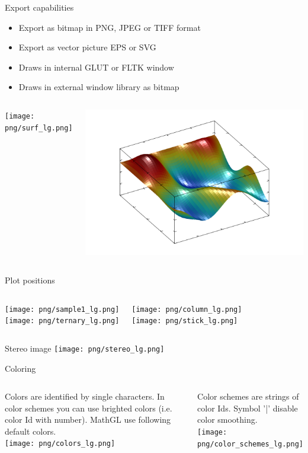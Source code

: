 \documentclass[color=usenames]{beamer}
\begin{document}
\begin{frame}{Export capabilities}
\begin{itemize}
\item Export as bitmap in PNG, JPEG or TIFF format
\item Export as vector picture EPS or SVG
\item Draws in internal GLUT or FLTK window
\item Draws in external window library as bitmap
\end{itemize}
\begin{columns}
\texttt{[image: png/surf\_lg.png]}

\includegraphics[width = \textwidth]{png/surf_eps.png}
\end{columns}
\end{frame}


\begin{frame}{Plot positions}
\begin{columns}
\texttt{[image: png/sample1\_lg.png]}\\
\texttt{[image: png/ternary\_lg.png]}

\texttt{[image: png/column\_lg.png]}\\
\texttt{[image: png/stick\_lg.png]}

\end{columns}
\end{frame}

\begin{frame}{Stereo image}
\texttt{[image: png/stereo\_lg.png]}
\end{frame}


\begin{frame}{Coloring}
\begin{columns}
Colors are identified by single characters. In color schemes you can use brighted colors (i.e. color Id with number). MathGL use following default colors.\\
\texttt{[image: png/colors\_lg.png]}

Color schemes are strings of color Ids. Symbol '|' disable color smoothing.\\
\texttt{[image: png/color\_schemes\_lg.png]}
\end{columns}
\end{frame}
\end{document}
